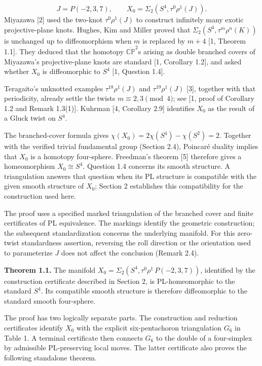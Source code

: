 \documentclass[11pt,letterpaper]{article}
\begin{document}
\[
J=P(-2,3,7),\qquad X_0=\Sigma_2\!\left(S^4,\tau^0\rho^1(J)\right).
\]
Miyazawa [2] used the two-knot $\tau^0\rho^1(J)$ to construct infinitely many exotic projective-plane knots. Hughes, Kim and Miller proved that $\Sigma_2(S^4,\tau^m\rho^n(K))$ is unchanged up to diffeomorphism when $m$ is replaced by $m+4$ [1, Theorem 1.1]. They deduced that the homotopy $\overline{\mathbb{CP}}^{2}$s arising as double branched covers of Miyazawa's projective-plane knots are standard [1, Corollary 1.2], and asked whether $X_0$ is diffeomorphic to $S^4$ [1, Question 1.4].

Teragaito's unknotted examples $\tau^{18}\rho^1(J)$ and $\tau^{19}\rho^1(J)$ [3], together with that periodicity, already settle the twists $m\equiv2,3\pmod4$; see [1, proof of Corollary 1.2 and Remark 1.3(1)]. Kuhrman [4, Corollary 2.9] identifies $X_0$ as the result of a Gluck twist on $S^4$.

The branched-cover formula gives $\chi(X_0)=2\chi(S^4)-\chi(S^2)=2$. Together with the verified trivial fundamental group (Section 2.4), Poincaré duality implies that $X_0$ is a homotopy four-sphere. Freedman's theorem [5] therefore gives a homeomorphism $X_0\cong S^4$. Question 1.4 concerns its smooth structure. A triangulation answers that question when its PL structure is compatible with the given smooth structure of $X_0$; Section 2 establishes this compatibility for the construction used here.

The proof uses a specified marked triangulation of the branched cover and finite certificates of PL equivalence. The markings identify the geometric construction; the subsequent standardization concerns the underlying manifold. For this zero-twist standardness assertion, reversing the roll direction or the orientation used to parameterize $J$ does not affect the conclusion (Remark 2.4).

\medskip\noindent\textbf{Theorem 1.1.} The manifold $X_0=\Sigma_2(S^4,\tau^0\rho^1\,P(-2,3,7))$, identified by the construction certificate described in Section 2, is PL-homeomorphic to the standard $S^4$. Its compatible smooth structure is therefore diffeomorphic to the standard smooth four-sphere.

The proof has two logically separate parts. The construction and reduction certificates identify $X_0$ with the explicit six-pentachoron triangulation $G_6$ in Table 1. A terminal certificate then connects $G_6$ to the double of a four-simplex by admissible PL-preserving local moves. The latter certificate also proves the following standalone theorem.
\end{document}
